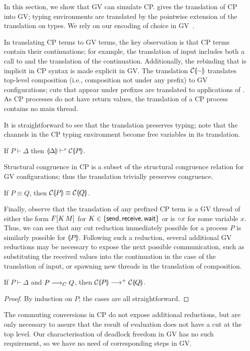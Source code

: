 \documentclass[oribibl,orivec,envcountsame]{llncs}
\begin{document}
In this section, we show that GV can simulate CP.  gives the translation of CP into
GV; typing environments are translated by the pointwise extension of the translation on types.  We
rely on our encoding of choice in GV~.


In translating CP terms to GV terms, the key observation is that CP terms contain their
continuations; for example, the translation of input includes both a call to  and
the translation of the continuation.  Additionally, the rebinding that is implicit in CP syntax is
made explicit in GV.  The translation $\mathcal{C}\llparenthesis - \rrparenthesis$ translates top-level composition (i.e.,
composition not under any prefix) to GV configurations; cuts that appear under prefixes are
translated to applications of .  As CP processes do not have return values, the
translation of a CP process contains no main thread.

It is straightforward to see that the translation preserves typing; note that the channels in the CP
typing environment become free variables in its translation.
%
\begin{theorem}
If $P \vdash \Delta$ then $\llparenthesis \Delta \rrparenthesis \vdash^{\mathord{\circ}} \mathcal{C}\llparenthesis P \rrparenthesis$.
\end{theorem}
%
Structural congruence in CP is a subset of the structural congruence relation for GV configurations;
thus the translation trivially preserves congruence.
%
\begin{theorem}
If $P \equiv Q$, then $\mathcal{C}\llparenthesis P \rrparenthesis \equiv \mathcal{C}\llparenthesis Q \rrparenthesis$.
\end{theorem}
%
Finally, observe that the translation of any prefixed CP term is a GV thread of either the form $F[K
\, M]$ for $K \in \{ \mathsf{send}, \mathsf{receive}, \mathsf{wait} \}$ or is ${\mathord{\circ}} x$ for
some variable $x$.  Thus, we can see that any cut reduction immediately possible for a process $P$
is similarly possible for $\llparenthesis P \rrparenthesis$.  Following such a reduction, several additional GV reductions
may be necessary to expose the next possible communication, such as substituting the received values
into the continuation in the case of the translation of input, or spawning new threads in the
translation of composition.
%
\begin{theorem}\label{thm:cp-reduction-simulated}
If $P \vdash \Delta$ and $P \longrightarrow_C Q$, then $\mathcal{C}\llparenthesis P \rrparenthesis \longrightarrow^+ \mathcal{C}\llparenthesis Q \rrparenthesis$.
\end{theorem}
%
\begin{proof}
  By induction on $P$; the cases are all straightforward.
\end{proof}
%
The commuting conversions in CP do not expose additional reductions, but are only necessary to
assure that the result of evaluation does not have a cut at the top level.  Our characterisation of
deadlock freedom in GV has no such requirement, so we have no need of corresponding steps in GV.
\end{document}
